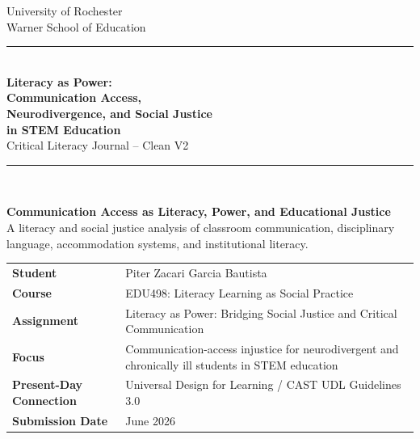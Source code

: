 \begin{titlepage}
\thispagestyle{empty}

\begin{center}
{\large University of Rochester\\}
{\normalsize Warner School of Education\\[0.35in]}

{\color{PrimaryRed}\rule{\textwidth}{1.4pt}}\\[0.22in]
{\Huge\bfseries Literacy as Power:\\[0.08in] Communication Access,\\[0.08in] Neurodivergence, and Social Justice\\[0.08in] in STEM Education}\\[0.18in]
{\Large Critical Literacy Journal -- Clean V2}\\[0.22in]
{\color{PrimaryRed}\rule{0.78\textwidth}{0.7pt}}\\[0.32in]

\colorbox{SoftBlue}{%
\parbox{0.88\textwidth}{%
\centering\vspace{0.12in}
\textbf{Communication Access as Literacy, Power, and Educational Justice}\\[0.05in]
A literacy and social justice analysis of classroom communication, disciplinary language, accommodation systems, and institutional literacy.
\vspace{0.12in}
}%
}
\end{center}

\vspace{0.25in}

\begin{center}
\renewcommand{\arraystretch}{1.15}
\setlength{\tabcolsep}{4pt}
\begin{tabular}{>{\bfseries\RaggedLeft}p{1.65in} p{4.9in}}
Student & Piter Zacari Garcia Bautista \\
Course & EDU498: Literacy Learning as Social Practice \\
Assignment & Literacy as Power: Bridging Social Justice and Critical Communication \\
Focus & Communication-access injustice for neurodivergent and chronically ill students in STEM education \\
Present-Day Connection & Universal Design for Learning / CAST UDL Guidelines 3.0 \\
Submission Date & June 2026 \\
\end{tabular}
\end{center}


\end{titlepage}
